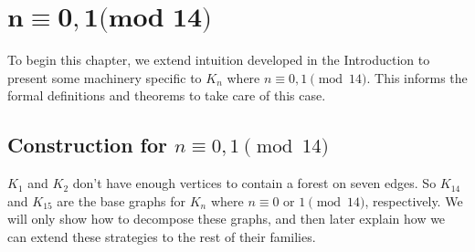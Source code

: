 \chapter{$\mathbf{n\equiv 0,1\textbf{(mod 14)}}$} \label{chap:0,1(mod 14)}

To begin this chapter, we extend intuition developed in the Introduction to present some machinery specific to $K_{n}$ where $n\equiv 0,1\pmod{14}$. This informs the formal definitions and theorems to take care of this case.

\section{Construction for $n\equiv 0,1 \pmod{14}$}\label{sec:0,1constr}
$K_{1}$ and $K_{2}$ don't have enough vertices to contain a forest on seven edges. So $K_{14}$ and $K_{15}$ are the base graphs for $K_{n}$ where $n \equiv 0 \textrm{ or } 1 \pmod{14}$, respectively. We will only show how to decompose these graphs, and then later explain how we can extend these strategies to the rest of their families.

